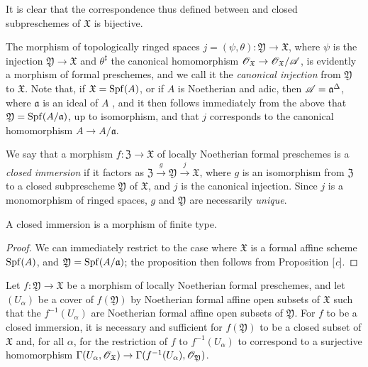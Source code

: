 It is clear that the correspondence thus defined between  and closed subpreschemes of $\mathfrak{X}$ is bijective.

The morphism of topologically ringed spaces $j=(\psi,\theta):\mathfrak{Y}\to\mathfrak{X}$, where $\psi$ is the injection $\mathfrak{Y}\to\mathfrak{X}$ and $\theta^\sharp$ the canonical homomorphism $\sh{O}_\mathfrak{X}\to\sh{O}_\mathfrak{X}/\sh{A}$, is evidently  a morphism of formal preschemes, and we call it the \emph{canonical injection} from $\mathfrak{Y}$ to $\mathfrak{X}$.
Note that, if $\mathfrak{X}=\operatorname{Spf}(A)$, or if $A$ is Noetherian and adic, then $\mathscr{A}=\mathfrak{a}^\Delta$, where $\mathfrak{a}$ is an ideal of $A$ , and it then follows immediately from the above that $\mathfrak{Y}=\operatorname{Spf}(A/\mathfrak{a})$, up to isomorphism, and that $j$ corresponds  to the canonical homomorphism $A\to A/\mathfrak{a}$.

We say that a morphism $f:\mathfrak{Z}\to\mathfrak{X}$ of locally Noetherian formal preschemes is a \emph{closed immersion} if it factors as $\mathfrak{Z}\xrightarrow{g}\mathfrak{Y}\xrightarrow{j}\mathfrak{X}$, where $g$ is an isomorphism from $\mathfrak{Z}$ to a closed subprescheme $\mathfrak{Y}$ of $\mathfrak{X}$, and $j$ is the canonical injection.
Since $j$ is a monomorphism of ringed spaces, $g$ and $\mathfrak{Y}$ are necessarily \emph{unique}.

\begin{proposition}[10.14.3]
\label{I.10.14.3}
A closed immersion is a morphism of finite type.
\end{proposition}

\begin{proof}
We can immediately restrict to the case where $\mathfrak{X}$ is a formal affine scheme $\operatorname{Spf}(A)$, and $\mathfrak{Y}=\operatorname{Spf}(A/\mathfrak{a})$;
the proposition then follows from Proposition [\emph{c}].
\end{proof}

\begin{lemma}[10.14.4]
\label{I.10.14.4}
Let $f:\mathfrak{Y}\to\mathfrak{X}$ be a morphism of locally Noetherian formal preschemes, and let $(U_\alpha)$ be a cover of $f(\mathfrak{Y})$ by Noetherian formal affine open subsets of $\mathfrak{X}$ such that the $f^{-1}(U_\alpha)$ are Noetherian formal affine open subsets of $\mathfrak{Y}$.
For $f$ to be a closed immersion, it is necessary and sufficient for $f(\mathfrak{Y})$ to be a closed subset of $\mathfrak{X}$ and, for all $\alpha$, for the restriction of $f$ to $f^{-1}(U_\alpha)$ to correspond  to a surjective homomorphism $\Gamma(U_\alpha,\sh{O}_\mathfrak{X})\to\Gamma(f^{-1}(U_\alpha),\sh{O}_\mathfrak{Y})$.
\end{lemma}

